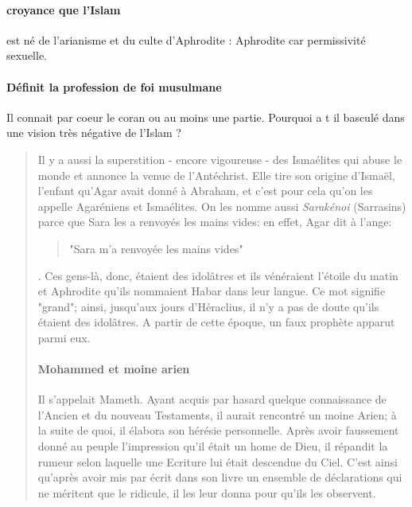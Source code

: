 \paragraph{croyance que l'Islam} est né de l'arianisme et du culte d'Aphrodite : Aphrodite car permissivité sexuelle.

\paragraph{Définit la profession de foi musulmane} Il connait par coeur le coran ou au moins une partie. Pourquoi a t il basculé dans une vision très négative de l'Islam ?


\begin{quote}
    Il y a aussi la superstition - encore vigoureuse - des Ismaélites qui abuse le monde et annonce la venue de l'Antéchrist. Elle tire son origine d'Ismaël, l'enfant qu'Agar avait donné à Abraham, et c'est pour cela qu'on les appelle Agaréniens et Ismaélites. On les nomme aussi \textit{Sarakénoi} (Sarrasins) parce que Sara les a renvoyés les mains vides: en effet, Agar dit à l'ange: 
    \begin{quote}
        "Sara m'a renvoyée les mains vides"
    \end{quote}. Ces gens-là, donc, étaient des idolâtres et ils vénéraient l'étoile du matin et Aphrodite qu'ils nommaient Habar dans leur langue. Ce mot signifie "grand"; ainsi, jusqu'aux jours d'Héraclius, il n'y a pas de doute qu'ils étaient des idolâtres. A partir de cette époque, un faux prophète apparut parmi eux.

\paragraph{Mohammed et moine arien}
Il s'appelait Mameth. Ayant acquis par hasard quelque connaissance de l'Ancien et du nouveau Testaments, il aurait rencontré un moine Arien; à la suite de quoi, il élabora son hérésie personnelle. Après avoir faussement donné au peuple l'impression qu'il était un home de Dieu, il répandit la rumeur selon laquelle une Ecriture lui était descendue du Ciel. C'est ainsi qu'après avoir mis par écrit dans son livre un ensemble de déclarations qui ne méritent que le ridicule, il les leur donna pour qu'ils les observent.


\end{quote}
